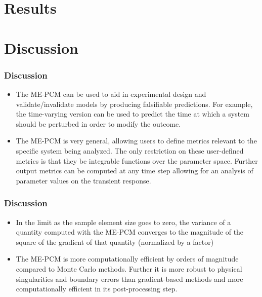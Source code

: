 \documentclass{beamer}
\theoremstyle{plain}
\theoremstyle{definition}
\begin{document}
\section{Results}

\section{Discussion}

\begin{frame}\frametitle{Discussion}
 \begin{itemize}
  \item The ME-PCM can be used to aid in experimental design and validate/invalidate models by producing falsifiable predictions. For example, the time-varying version can be used to predict the time at which a system should be perturbed in order to modify the outcome.
  \item The ME-PCM is very general, allowing users to define metrics relevant to the specific system being analyzed. The only restriction on these user-defined metrics is that they be integrable functions over the parameter space. Further output metrics can be computed at any time step allowing for an analysis of parameter values on the transient response.
 \end{itemize}
\end{frame}

\begin{frame}\frametitle{Discussion}
 \begin{itemize}
  \item In the limit as the sample element size goes to zero, the variance of a quantity computed with the ME-PCM converges to the magnitude of the square of the gradient of that quantity (normalized by a factor)
  \item The ME-PCM is more computationally efficient by orders of magnitude compared to Monte Carlo methods. Further it is more robust to physical singularities and boundary errors than gradient-based methods and more computationally efficient in its post-processing step.
 \end{itemize}
\end{frame}
\end{document}
